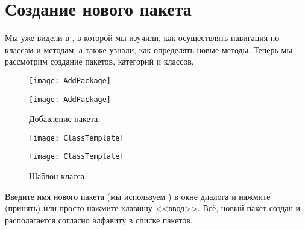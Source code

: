 \documentclass[a4paper,10pt,twoside]{book}
\begin{document}
\section{Создание нового пакета}

Мы уже видели  в , в которой мы изучили, как осуществлять навигация по классам и методам, а также узнали, как определять новые методы.
Теперь мы рассмотрим создание пакетов, категорий и классов.

\dothis{Откройте браузер и сделайте \actclick на панели пакетов.
Выберите \menu{create package}.\footnote{Мы предполагаем, что браузер пакетов (Package Browser) установлен в качестве браузера по-умолчанию (как и должно быть в норме). Если браузер, который вы видите, не похож на изображённый на \figref{addPackage}, вам будет нужно поменять его (см. \faqref{packagebrowser}).}}

\begin{figure}[htb]
\begin{minipage}[b]{0.48\textwidth}
\ifluluelse
	{\centerline {\texttt{[image: AddPackage]}}}
	{\centerline {\texttt{[image: AddPackage]}}}
	\caption{Добавление пакета.
	}
\end{minipage}
\hfill
\begin{minipage}[b]{0.48\textwidth}
\ifluluelse
	{\centerline {\texttt{[image: ClassTemplate]}}}
	{\centerline {\texttt{[image: ClassTemplate]}}}
	\caption{Шаблон класса.
	}
\end{minipage}
\end{figure}

Введите имя нового пакета (мы используем ) в окне диалога и нажмите  (принять) или просто нажмите клавишу <<ввод>>. Всё, новый пакет создан и располагается согласно алфавиту в списке пакетов.
\end{document}
